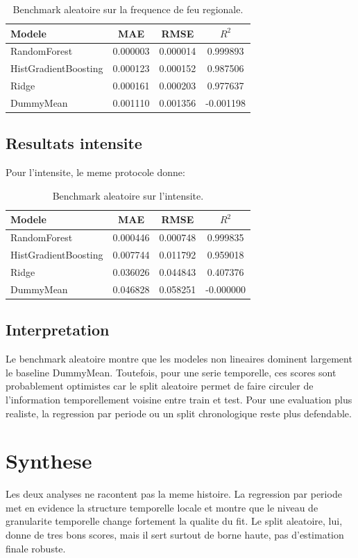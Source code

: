 \documentclass[11pt,a4paper]{article}
\begin{document}
\begin{table}[H]
\centering
\begin{tabular}{lccc}
\toprule
\textbf{Modele} & \textbf{MAE} & \textbf{RMSE} & \textbf{$R^2$} \\
\midrule
RandomForest & 0.000003 & 0.000014 & 0.999893 \\
HistGradientBoosting & 0.000123 & 0.000152 & 0.987506 \\
Ridge & 0.000161 & 0.000203 & 0.977637 \\
DummyMean & 0.001110 & 0.001356 & -0.001198 \\
\bottomrule
\end{tabular}
\caption{Benchmark aleatoire sur la frequence de feu regionale.}
\end{table}

\subsection{Resultats intensite}
Pour l'intensite, le meme protocole donne:

\begin{table}[H]
\centering
\begin{tabular}{lccc}
\toprule
\textbf{Modele} & \textbf{MAE} & \textbf{RMSE} & \textbf{$R^2$} \\
\midrule
RandomForest & 0.000446 & 0.000748 & 0.999835 \\
HistGradientBoosting & 0.007744 & 0.011792 & 0.959018 \\
Ridge & 0.036026 & 0.044843 & 0.407376 \\
DummyMean & 0.046828 & 0.058251 & -0.000000 \\
\bottomrule
\end{tabular}
\caption{Benchmark aleatoire sur l'intensite.}
\end{table}

\subsection{Interpretation}
Le benchmark aleatoire montre que les modeles non lineaires dominent largement le baseline DummyMean. Toutefois, pour une serie temporelle, ces scores sont probablement optimistes car le split aleatoire permet de faire circuler de l'information temporellement voisine entre train et test. Pour une evaluation plus realiste, la regression par periode ou un split chronologique reste plus defendable.

\section{Synthese}
Les deux analyses ne racontent pas la meme histoire. La regression par periode met en evidence la structure temporelle locale et montre que le niveau de granularite temporelle change fortement la qualite du fit. Le split aleatoire, lui, donne de tres bons scores, mais il sert surtout de borne haute, pas d'estimation finale robuste.
\end{document}
